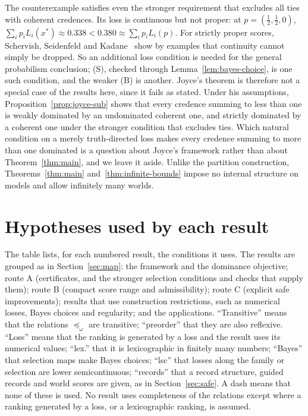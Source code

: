 \documentclass[11pt]{article}
\theoremstyle{definition}
\theoremstyle{remark}
\begin{document}
The counterexample satisfies even the stronger requirement that excludes all ties with coherent credences. Its loss is continuous but not proper: at $p=(\tfrac12,\tfrac12,0)$, $\sum_ip_iL_i(x^*)\approx0.338<0.380\approx\sum_ip_iL_i(p)$. For strictly proper scores, Schervish, Seidenfeld and Kadane~\cite{SSK09} show by examples that continuity cannot simply be dropped. So an additional loss condition is needed for the general probabilism conclusion; (S), checked through Lemma~\ref{lem:bayes-choice}, is one such condition, and the weaker (B) is another. Joyce's theorem is therefore not a special case of the results here, since it fails as stated. Under his assumptions, Proposition~\ref{prop:joyce-sub} shows that every credence summing to less than one is weakly dominated by an undominated coherent one, and strictly dominated by a coherent one under the stronger condition that excludes ties. Which natural condition on a merely truth-directed loss makes every credence summing to more than one dominated is a question about Joyce's framework rather than about Theorem~\ref{thm:main}, and we leave it aside. Unlike the partition construction, Theorems~\ref{thm:main} and~\ref{thm:infinite-bounds} impose no internal structure on models and allow infinitely many worlds.


\section{Hypotheses used by each result}\label{sec:hypotheses}
The table lists, for each numbered result, the conditions it uses. The results are grouped as in Section~\ref{sec:map}: the framework and the dominance objective; route A (certificates, and the stronger selection conditions and checks that supply them); route B (compact score range and admissibility); route C (explicit safe improvements); results that use construction restrictions, such as numerical losses, Bayes choices and regularity; and the applications. ``Transitive'' means that the relations $\preceq_\omega$ are transitive; ``preorder'' that they are also reflexive. ``Loss'' means that the ranking is generated by a loss and the result uses its numerical values; ``lex.'' that it is lexicographic in finitely many numbers; ``Bayes'' that selection maps make Bayes choices; ``lsc'' that losses along the family or selection are lower semicontinuous; ``records'' that a record structure, guided records and world scores are given, as in Section~\ref{sec:safe}. A dash means that none of these is used. No result uses completeness of the relations except where a ranking generated by a loss, or a lexicographic ranking, is assumed.
\end{document}
